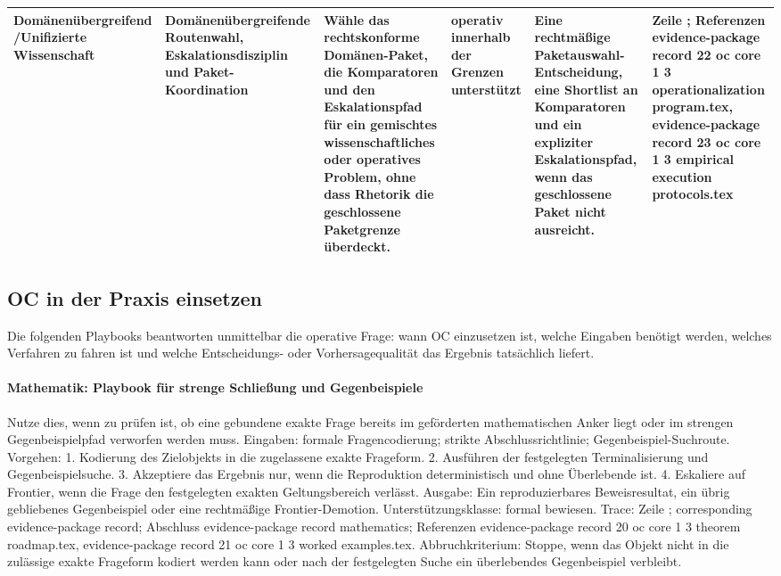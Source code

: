 \begin{longtable}{@{}L{0.11\textwidth}L{0.16\textwidth}L{0.19\textwidth}L{0.12\textwidth}L{0.18\textwidth}L{0.16\textwidth}@{}}
Domänenübergreifend /\allowbreak Unifizierte Wissenschaft & Domänenübergreifende Routenwahl, Eskalationsdisziplin und Paket-Koordination & Wähle das rechtskonforme Domänen-Paket, die Komparatoren und den Eskalationspfad für ein gemischtes wissenschaftliches oder operatives Problem, ohne dass Rhetorik die geschlossene Paketgrenze überdeckt. & operativ innerhalb der Grenzen unterstützt & Eine rechtmäßige Paketauswahl-Entscheidung, eine Shortlist an Komparatoren und ein expliziter Eskalationspfad, wenn das geschlossene Paket nicht ausreicht. & Zeile ; \allowbreak Referenzen evidence-package record 22 oc core 1 3 operationalization program.tex, \allowbreak evidence-package record 23 oc core 1 3 empirical execution protocols.tex \\
\bottomrule
\end{longtable}
\endgroup

\subsection{OC in der Praxis einsetzen}
Die folgenden Playbooks beantworten unmittelbar die operative Frage: wann OC einzusetzen ist, welche Eingaben benötigt werden, welches Verfahren zu fahren ist und welche Entscheidungs- oder Vorhersagequalität das Ergebnis tatsächlich liefert.

\paragraph{Mathematik: Playbook für strenge Schließung und Gegenbeispiele}
Nutze dies, wenn zu prüfen ist, ob eine gebundene exakte Frage bereits im geförderten mathematischen Anker liegt oder im strengen Gegenbeispielpfad verworfen werden muss.
Eingaben: formale Fragencodierung; \allowbreak strikte Abschlussrichtlinie; \allowbreak Gegenbeispiel-Suchroute.
Vorgehen: 1. Kodierung des Zielobjekts in die zugelassene exakte Frageform. 2. Ausführen der festgelegten Terminalisierung und Gegenbeispielsuche. 3. Akzeptiere das Ergebnis nur, wenn die Reproduktion deterministisch und ohne Überlebende ist. 4. Eskaliere auf Frontier, wenn die Frage den festgelegten exakten Geltungsbereich verlässt.
Ausgabe: Ein reproduzierbares Beweisresultat, ein übrig gebliebenes Gegenbeispiel oder eine rechtmäßige Frontier-Demotion.
Unterstützungsklasse: formal bewiesen.
Trace: Zeile ; corresponding evidence-package record; \allowbreak Abschluss evidence-package record mathematics; \allowbreak Referenzen evidence-package record 20 oc core 1 3 theorem roadmap.tex, \allowbreak evidence-package record 21 oc core 1 3 worked examples.tex.
Abbruchkriterium: Stoppe, wenn das Objekt nicht in die zulässige exakte Frageform kodiert werden kann oder nach der festgelegten Suche ein überlebendes Gegenbeispiel verbleibt.

